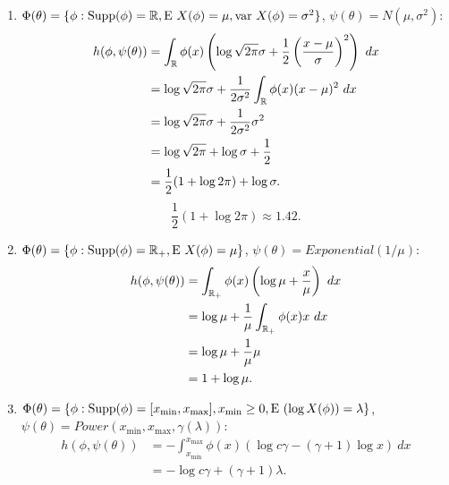 \documentclass[10pt,a4paper]{article}
\theoremstyle{plain} \newtheorem{Lem}{Lemma}
\begin{document}
\begin{enumerate}

\item
$ \Phi(\theta) = \{\phi: \mathrm {Supp}(\phi)= \mathbb R, \mathrm E \  X(\phi)=\mu, \mathrm {var} \  X(\phi)=\sigma^2\}$, $\psi(\theta) = N(\mu,\sigma^2)$:
\begin{equation*}
\begin{split}
 h(\phi,\psi(\theta)) &= \int_\mathbb R \phi(x) \left(\log \sqrt {2 \pi} \sigma + \frac 1 2 \left(\frac {x - \mu} \sigma \right)^2 \right) \ dx \\
  &= \log \sqrt {2 \pi} \sigma + \frac 1 {2 \sigma^2} \int_\mathbb R \phi(x) (x - \mu)^2 \ dx \\
  &= \log \sqrt {2 \pi} \sigma + \frac 1 {2 \sigma^2} \sigma^2 \\
  &= \log \sqrt {2 \pi} + \log \sigma + \frac 1 2 \\
  &= \frac 1 2 (1 + \log 2 \pi) + \log \sigma.
\end{split}
\end{equation*}
$$ \frac 1 2 (1 + \log 2 \pi) \approx 1.42. $$

\item
$ \Phi(\theta) = \{\phi: \mathrm {Supp}(\phi)= \mathbb R_+, \mathrm E \  X(\phi)=\mu\}$, $\psi(\theta) = \mathit {Exponential}(1 / \mu)$:
\begin{equation*}
\begin{split}
 h(\phi,\psi(\theta)) &= \int_{\mathbb R_+} \phi(x) \left (\log \mu + \frac x \mu \right) \ dx \\
  &= \log \mu + \frac 1 \mu \int_{\mathbb R_+} \phi(x) x \ dx \\
  &= \log \mu + \frac 1 \mu \mu \\
  &= 1 + \log \mu.
\end{split}
\end{equation*}

\item 
$ \Phi(\theta) = \{\phi: \mathrm {Supp}(\phi)= [x_{\mathrm {min}}, x_{\mathrm{max}}], x_{\mathrm {min}} \ge 0, \mathrm E \  (\log X(\phi))=\lambda\}$, 
$\psi(\theta) = Power(x_{\mathrm {min}}, x_{\mathrm{max}},\gamma(\lambda))$:
\begin{equation*}
\begin{split}
 h(\phi,\psi(\theta)) &= 
     - \int_{x_{\mathrm {min}}}^{x_{\mathrm {max}}} \phi(x) \left(\log c \gamma - (\gamma + 1) \log x \right) \ dx \\
  &= - \log c \gamma + (\gamma + 1) \lambda.
\end{split}
\end{equation*}

\end{enumerate}
\end{document}
